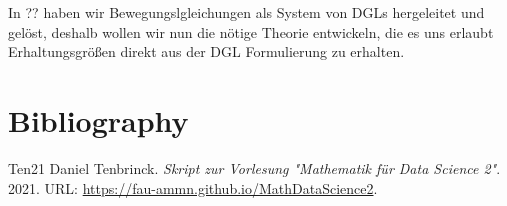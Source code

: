 \documentclass[letterpaper,10pt,english]{jupyterBook}
\begin{document}
In ?? haben wir Bewegungslgleichungen als System von DGLs hergeleitet und gelöst, deshalb wollen wir nun die nötige Theorie entwickeln, die es uns erlaubt Erhaltungsgrößen direkt aus der DGL Formulierung zu erhalten.
\label{ode/hamilton:example-0}
\begin{example}{}{}


\end{example}


\chapter{Bibliography}
\label{\detokenize{references:bibliography}}\label{\detokenize{references::doc}}


\begin{sphinxthebibliography}{Ten21}
Daniel Tenbrinck. \emph{Skript zur Vorlesung "Mathematik für Data Science 2"}. 2021. URL: \url{https://fau-ammn.github.io/MathDataScience2}.
\end{sphinxthebibliography}






\renewcommand{\indexname}{Proof Index}


\renewcommand{\indexname}{Index}
\end{document}
